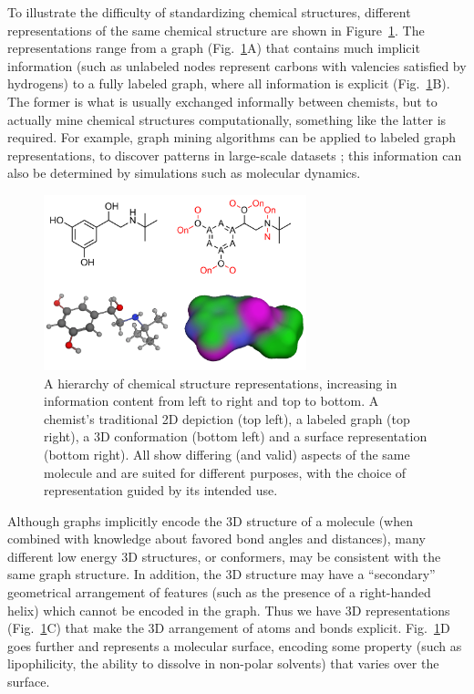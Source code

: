 \documentclass{sig-alternate}
\begin{document}
To illustrate the difficulty of standardizing chemical structures,
different representations of the same chemical structure are shown in
Figure~\ref{figure:chemical-structures}. The representations range
from a graph (Fig.~\ref{figure:chemical-structures}A) that contains
much implicit information (such as unlabeled nodes represent carbons
with valencies satisfied by hydrogens) to a fully labeled graph,
where all information is explicit
(Fig.~\ref{figure:chemical-structures}B). The former is what is
usually exchanged informally between chemists, but to actually mine
chemical structures computationally, something like the latter is
required.  For example, graph mining algorithms can be applied to
labeled graph representations, to discover patterns in large-scale
datasets \cite{horst2009}; this information can also be determined by simulations such as molecular dynamics.

\begin{figure}
\centering
\includegraphics[height=2in]{chemical-structures.png}
\caption{A hierarchy of chemical structure representations, increasing
  in information content from left to right and top to bottom. A
  chemist's traditional 2D depiction (top left), a labeled graph (top right), a 3D
  conformation (bottom left) and a surface representation (bottom right). All show differing
  (and valid) aspects of the same molecule and are suited for
  different purposes, with the choice of representation guided by its
  intended use.}
\label{figure:chemical-structures}
\end{figure}

Although graphs implicitly encode the 3D structure of a molecule (when
combined with knowledge about favored bond angles and distances), many
different low energy 3D structures, or conformers, may be consistent
with the same graph structure. In addition, the 3D structure may have
a ``secondary'' geometrical arrangement of features (such as the
presence of a right-handed helix) which cannot be encoded in the
graph. Thus we have 3D representations
(Fig.~\ref{figure:chemical-structures}C) that make the 3D arrangement
of atoms and bonds explicit. Fig.~\ref{figure:chemical-structures}D
goes further and represents a molecular surface, encoding some
property (such as lipophilicity, the ability to dissolve in non-polar
solvents) that varies over the surface.
\end{document}
